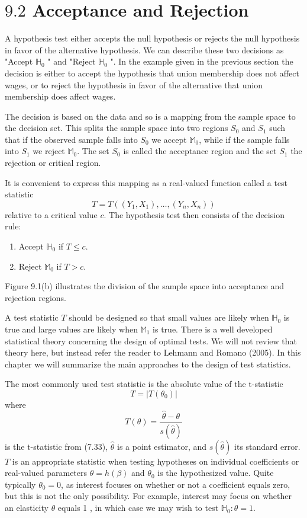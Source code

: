 \documentclass[10pt]{article}
\begin{document}
\section{$9.2$ Acceptance and Rejection}
A hypothesis test either accepts the null hypothesis or rejects the null hypothesis in favor of the alternative hypothesis. We can describe these two decisions as "Accept $\mathbb{H}_{0}$ " and "Reject $\mathbb{H}_{0}$ ". In the example given in the previous section the decision is either to accept the hypothesis that union membership does not affect wages, or to reject the hypothesis in favor of the alternative that union membership does affect wages.

The decision is based on the data and so is a mapping from the sample space to the decision set. This splits the sample space into two regions $S_{0}$ and $S_{1}$ such that if the observed sample falls into $S_{0}$ we accept $\mathbb{M}_{0}$, while if the sample falls into $S_{1}$ we reject $\mathbb{M}_{0}$. The set $S_{0}$ is called the acceptance region and the set $S_{1}$ the rejection or critical region.

It is convenient to express this mapping as a real-valued function called a test statistic
$$
T=T\left(\left(Y_{1}, X_{1}\right), \ldots,\left(Y_{n}, X_{n}\right)\right)
$$
relative to a critical value $c$. The hypothesis test then consists of the decision rule:

\begin{enumerate}
  \item Accept $\mathbb{H}_{0}$ if $T \leq c$.

  \item Reject $\mathbb{M}_{0}$ if $T>c$.

\end{enumerate}
Figure 9.1(b) illustrates the division of the sample space into acceptance and rejection regions.

A test statistic $T$ should be designed so that small values are likely when $\mathbb{H}_{0}$ is true and large values are likely when $\mathbb{M}_{1}$ is true. There is a well developed statistical theory concerning the design of optimal tests. We will not review that theory here, but instead refer the reader to Lehmann and Romano (2005). In this chapter we will summarize the main approaches to the design of test statistics.

The most commonly used test statistic is the absolute value of the t-statistic
$$
T=\left|T\left(\theta_{0}\right)\right|
$$
where
$$
T(\theta)=\frac{\widehat{\theta}-\theta}{s(\widehat{\theta})}
$$
is the t-statistic from (7.33), $\widehat{\theta}$ is a point estimator, and $s(\widehat{\theta})$ its standard error. $T$ is an appropriate statistic when testing hypotheses on individual coefficients or real-valued parameters $\theta=h(\beta)$ and $\theta_{0}$ is the hypothesized value. Quite typically $\theta_{0}=0$, as interest focuses on whether or not a coefficient equals zero, but this is not the only possibility. For example, interest may focus on whether an elasticity $\theta$ equals 1 , in which case we may wish to test $\mathbb{H}_{0}: \theta=1$.
\end{document}
